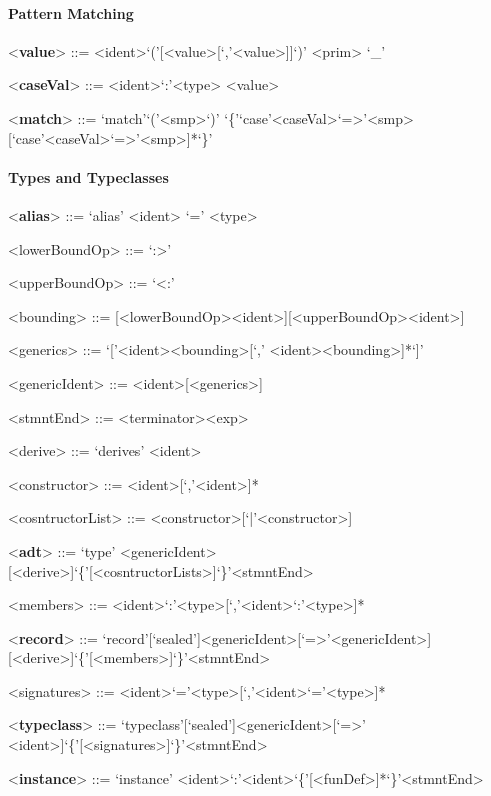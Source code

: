 \documentclass[11pt]{article} %
\begin{document}
\paragraph{Pattern Matching}

\begin{grammar}

<\textbf{value}> ::= <ident>`('[<value>[`,'<value>]]`)'
\alt <prim>
\alt `\_'

<\textbf{caseVal}> ::= <ident>`:'<type>
\alt <value>

<\textbf{match}> ::= `match'`('<smp>`)' `\{'`case'<caseVal>`=>'<smp>[`case'<caseVal>`=>'<smp>]*`\}'

\end{grammar}

\paragraph{Types and Typeclasses}

\begin{grammar}

<\textbf{alias}> ::= `alias' <ident> `=' <type>

<lowerBoundOp> ::= `:>'

<upperBoundOp> ::= `<:'

<bounding> ::= [<lowerBoundOp><ident>][<upperBoundOp><ident>]

<generics> ::= `['<ident><bounding>[`,' <ident><bounding>]*`]'

<genericIdent> ::= <ident>[<generics>]

<stmntEnd> ::= <terminator><exp>

<derive> ::= `derives' <ident>

<constructor> ::= <ident>[`,'<ident>]*

<cosntructorList> ::= <constructor>[`|'<constructor>]

<\textbf{adt}> ::= `type' <genericIdent>[<derive>]`\{'[<cosntructorLists>]`\}'<stmntEnd>

<members> ::= <ident>`:'<type>[`,'<ident>`:'<type>]*

<\textbf{record}> ::= `record'[`sealed']<genericIdent>[`=>'<genericIdent>][<derive>]`\{'[<members>]`\}'<stmntEnd>

<signatures> ::= <ident>`='<type>[`,'<ident>`='<type>]*
 
<\textbf{typeclass}> ::= `typeclass'[`sealed']<genericIdent>[`=>' <ident>]`\{'[<signatures>]`\}'<stmntEnd>

<\textbf{instance}> ::= `instance' <ident>`:'<ident>`\{'[<funDef>]*`\}'<stmntEnd>

\end{grammar}
\end{document}
